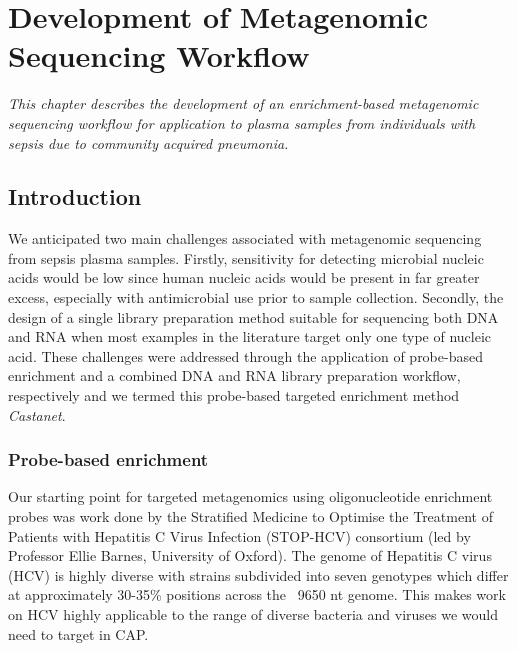 \chapter{Development of Metagenomic Sequencing Workflow}
\label{ch:Results1}
\textit{This chapter describes the development of an enrichment-based metagenomic sequencing workflow for application to plasma samples from individuals with sepsis due to community acquired pneumonia.}

\startcontents[chapters]{\vspace{-1.4cm}}
\singlespacing
{}
\doublespacing

\section{Introduction}
We anticipated two main challenges associated with metagenomic sequencing from sepsis plasma samples. Firstly, sensitivity for detecting microbial nucleic acids would be low since human nucleic acids would be present in far greater excess, especially with antimicrobial use prior to sample collection. Secondly, the design of a single library preparation method suitable for sequencing both DNA and RNA when most examples in the literature target only one type of nucleic acid. These challenges were addressed through the application of probe-based enrichment and a combined DNA and RNA library preparation workflow, respectively and we termed this probe-based targeted enrichment method \textit{Castanet}.

\subsection{Probe-based enrichment} 
Our starting point for targeted metagenomics using oligonucleotide enrichment probes was work done \parencite{Bonsall2015} by the Stratified Medicine to Optimise the Treatment of Patients with Hepatitis C Virus Infection (STOP-HCV) consortium (led by Professor Ellie Barnes, University of Oxford). The genome of Hepatitis C virus (HCV) is highly diverse with strains subdivided into seven genotypes which differ at approximately 30-35\% positions across the ~9650 nt genome. This makes work on HCV highly applicable to the range of diverse bacteria and viruses we would need to target in CAP.


